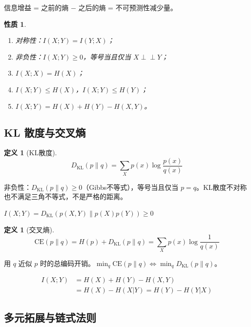 \documentclass[12pt,a4paper]{ctexart}
\newtheorem{property}[theorem]{性质}
\theoremstyle{definition}
\newtheorem{definition}[theorem]{定义}
\newcommand{\DKL}{D_{\mathrm{KL}}}
\newcommand{\indep}{\perp\!\!\!\perp}
\begin{document}
信息增益 = 之前的熵 $-$ 之后的熵 = 不可预测性减少量。

\begin{property}
\begin{enumerate}[label=(\arabic*),nosep]
  \item 对称性：$I(X;Y) = I(Y;X)$；
  \item 非负性：$I(X;Y) \geq 0$，等号当且仅当 $X \indep Y$；
  \item $I(X;X) = H(X)$；
  \item $I(X;Y) \leq H(X)$，$I(X;Y) \leq H(Y)$；
  \item $I(X;Y) = H(X) + H(Y) - H(X,Y)$。
\end{enumerate}
\end{property}

\subsection{KL 散度与交叉熵}

\begin{definition}[KL散度]
\[
\DKL(p\|q) = \sum_X p(x) \log\frac{p(x)}{q(x)}
\]
\end{definition}

非负性：$\DKL(p\|q) \geq 0$（Gibbs不等式），等号当且仅当 $p=q$。KL散度不对称也不满足三角不等式，不是严格的距离。

\begin{keybox}[互信息与KL散度的关系]
$I(X;Y) = \DKL(p(X,Y) \| p(X)p(Y)) \geq 0$
\end{keybox}

\begin{definition}[交叉熵]
\[
\mathrm{CE}(p\|q) = H(p) + \DKL(p\|q) = \sum_X p(x) \log\frac{1}{q(x)}
\]
\end{definition}

用 $q$ 近似 $p$ 时的总编码开销。$\min_q \mathrm{CE}(p\|q) \Leftrightarrow \min_q \DKL(p\|q)$。

\begin{keybox}[Venn图核心关系]
\begin{align*}
I(X;Y) &= H(X) + H(Y) - H(X,Y) \\
&= H(X) - H(X|Y) = H(Y) - H(Y|X)
\end{align*}
\end{keybox}

\subsection{多元拓展与链式法则}
\end{document}
